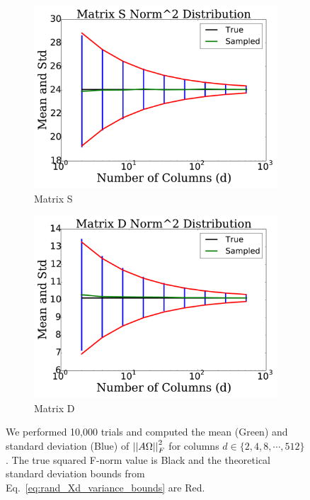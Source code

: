 \begin{figure}[p]
    \begin{subfigure}{0.45\textwidth}
    \includegraphics[width=\textwidth]{plots/mat_S_error_test_2.pdf}
    \caption{Matrix S}
    \end{subfigure}
    \begin{subfigure}{0.45\textwidth}
    \includegraphics[width=\textwidth]{plots/mat_D_error_test_2.pdf}
    \caption{Matrix D}
    \end{subfigure}

\caption[GEB Stochastic Squared F-norm Approximations]{
We performed 10,000 trials and computed the
mean (Green) and standard deviation (Blue) of $\left| \left| A\Omega \right| \right|_{F}^{2}$
for columns $d\in\{2,4,8,\cdots,512\}$.
The true squared F-norm value is Black and the theoretical standard
deviation bounds from Eq.~\eqref{eq:rand_Xd_variance_bounds} are Red.
}
\label{fig:geb_norm_squared_bound_mat}
\end{figure}



